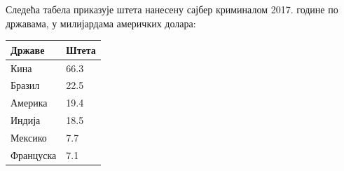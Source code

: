 \documentclass[a4paper]{article}
\begin{document}
	Следећа табела\cite{tabelaStete} приказује штета нанесену сајбер криминалом 2017. године по државама, у милијардама америчких долара: 
	\begin{table}[h!]
		\centering
		\begin{tabular}{|l|l|}
			\hline
			Државе & Штета \\ \hline
			Кина & 66.3 \\ \hline
			Бразил & 22.5 \\ \hline
			Америка & 19.4 \\ \hline
			Индија & 18.5 \\ \hline
			Мексико & 7.7 \\ \hline
			Француска & 7.1 \\
			\hline
		\end{tabular}
	\end{table}
\end{document}
